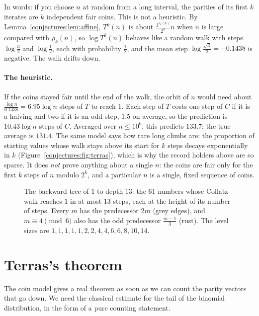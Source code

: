 In words: if you choose $n$ at random from a long interval, the parities of its first $k$ iterates are $k$ independent fair coins. This is not a
heuristic. By Lemma~\ref{conjectures:lem:affine}, $T^k(n)$ is about $\frac{3^{s_k(n)}}{2^k}n$ when $n$ is large compared with $\rho_k(n)$, so $\log T^k(n)$ behaves
like a random walk with steps $\log\frac32$ and $\log\frac12$, each with probability $\frac12$, and the mean step $\log\frac{\sqrt3}2=-0.1438$ is
negative. The walk drifts down.

\paragraph{The heuristic.} If the coins stayed fair until the end of the walk, the orbit of $n$ would need about $\frac{\log n}{0.1438}=6.95\log n$
steps of $T$ to reach $1$. Each step of $T$ costs one step of $C$ if it is a halving and two if it is an odd step, $1.5$ on average, so the prediction is
$10.43\log n$ steps of $C$. Averaged over $n\le10^6$, this predicts $133.7$; the true average is $131.4$. The same model says how rare long climbs are: the
proportion of starting values whose walk stays above its start for $k$ steps decays exponentially in $k$ (Figure~\ref{conjectures:fig:terras}), which is why the
record holders above are so sparse. It does \emph{not} prove anything about a single $n$: the coins
are fair only for the first $k$ steps of $n$ modulo $2^k$, and a particular $n$ is a single, fixed sequence of coins.

\begin{figure}[ht]
\centering
{}
\caption{The backward tree of $1$ to depth $13$: the $61$ numbers whose Collatz walk reaches $1$ in at most $13$ steps, each at the height of its number
of steps. Every $m$ has the predecessor $2m$ (grey edges), and $m\equiv4\pmod6$ also has the odd predecessor $\frac{m-1}3$ (rust). The level sizes are
$1,1,1,1,1,2,2,4,4,6,6,8,10,14$.}
\label{conjectures:fig:tree}
\end{figure}

\section{Terras's theorem}

The coin model gives a real theorem as soon as we can count the parity vectors that go down. We need the classical estimate for the tail of the binomial
distribution, in the form of a pure counting statement.

